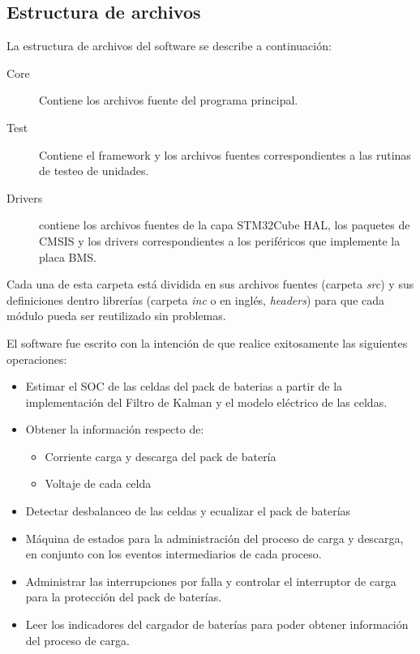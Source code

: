 \documentclass[10pt, a4paper]{report}
\begin{document}
\subsection{Estructura de archivos}

La estructura de archivos del software se describe a continuación:

\begin{description}
    \item [Core] Contiene los archivos fuente del programa principal.
    \item [Test] Contiene el framework y los archivos fuentes correspondientes a
        las rutinas de testeo de unidades.
    \item[Drivers] contiene los archivos fuentes de la capa STM32Cube HAL, los
        paquetes de \acrshort{CMSIS} y los drivers correspondientes a los periféricos que
        implemente la placa \acrshort{BMS}.
\end{description}

Cada una de esta carpeta est\'a dividida en sus archivos fuentes (carpeta
\emph{src}) y sus definiciones dentro librer\'ias (carpeta \emph{inc} o en
ingl\'es, \emph{headers}) para que cada m\'odulo pueda ser reutilizado sin 
problemas.

El software fue escrito con la intención de que realice exitosamente las
siguientes operaciones: 

\begin{itemize}
    \item Estimar el \acrshort{SOC} de las celdas del pack de baterias a partir
        de la implementación del Filtro de Kalman y el modelo eléctrico de las
        celdas. 
    \item Obtener la información respecto de: 
        \begin{itemize}
            \item Corriente carga y descarga del pack de batería
            \item Voltaje de cada celda
        \end{itemize}
    \item Detectar desbalanceo de las celdas y ecualizar el pack de baterías
    \item M\'aquina de estados para la administraci\'on del proceso de carga y
        descarga, en conjunto con los eventos intermediarios de cada proceso.
    \item Administrar las interrupciones por falla y controlar el interruptor de
        carga para la protecci\'on del pack de bater\'ias.
    \item Leer los indicadores del cargador de bater\'ias para poder obtener
        informaci\'on del proceso de carga.
\end{itemize}
\end{document}
